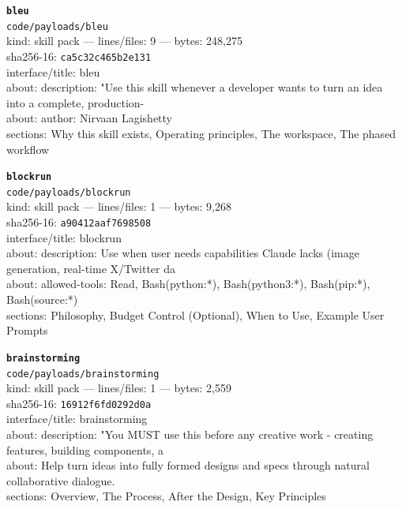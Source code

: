 \noindent\textbf{\texttt{bleu}}\\
\texttt{code/payloads/bleu}\\
kind: skill pack --- lines/files: 9 --- bytes: 248,275\\
sha256-16: \texttt{ca5c32c465b2e131}\\
interface/title: bleu\\
about: description: "Use this skill whenever a developer wants to turn an idea into a complete, production-\\
about: author: Nirvaan Lagishetty\\
sections: Why this skill exists, Operating principles, The workspace, The phased workflow\\
\vspace*{6.0pt}
\newpage

\noindent\textbf{\texttt{blockrun}}\\
\texttt{code/payloads/blockrun}\\
kind: skill pack --- lines/files: 1 --- bytes: 9,268\\
sha256-16: \texttt{a90412aaf7698508}\\
interface/title: blockrun\\
about: description: Use when user needs capabilities Claude lacks (image generation, real-time X/Twitter da\\
about: allowed-tools: Read, Bash(python:*), Bash(python3:*), Bash(pip:*), Bash(source:*)\\
sections: Philosophy, Budget Control (Optional), When to Use, Example User Prompts\\
\vspace*{6.0pt}

\noindent\textbf{\texttt{brainstorming}}\\
\texttt{code/payloads/brainstorming}\\
kind: skill pack --- lines/files: 1 --- bytes: 2,559\\
sha256-16: \texttt{16912f6fd0292d0a}\\
interface/title: brainstorming\\
about: description: "You MUST use this before any creative work - creating features, building components, a\\
about: Help turn ideas into fully formed designs and specs through natural collaborative dialogue.\\
sections: Overview, The Process, After the Design, Key Principles\\
\vspace*{6.0pt}


